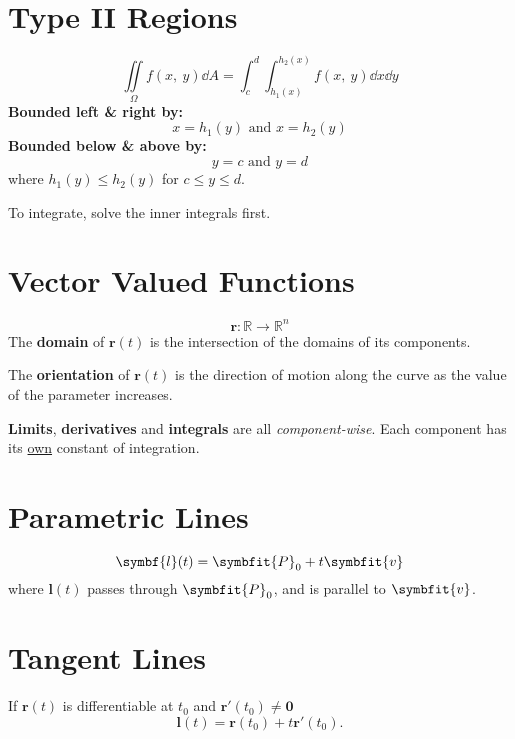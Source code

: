 \documentclass{article}
\begin{document}
\begin{multicols}{3}
    \section*{Type II Regions}
    \begin{equation*}
        \iint\limits_{\Omega} f(x,\: y) \dd{A} = \int_c^d\int_{h_1(x)}^{h_2(x)} f(x,\: y) \dd{x} \dd{y}
    \end{equation*}
    \textbf{Bounded left \& right by:}
    \begin{equation*}
        x=h_1(y) \text{ and } x=h_2(y)
    \end{equation*}
    \textbf{Bounded below \& above by:}
    \begin{equation*}
        y=c \text{ and } y=d
    \end{equation*}
    where $h_1(y) \leq h_2(y)$ for $c \leq y \leq d$.

    To integrate, solve the inner integrals first.
    \section*{Vector Valued Functions}
    \begin{equation*}
        \symbf{r}:\mathbb{R} \to \mathbb{R}^n
    \end{equation*}
    The \textbf{domain} of $\symbf{r}(t)$ is the intersection of the domains
    of its components.

    The \textbf{orientation} of $\symbf{r}(t)$ is the direction of motion along the
    curve as the value of the parameter increases.

    \textbf{Limits}, \textbf{derivatives} and \textbf{integrals} are all \textit{component-wise}. Each component has its \underline{own} constant of integration.
    \section*{Parametric Lines}
    \begin{equation*}
        \symbf{l}(t) = \symbfit{P}_0 + t\symbfit{v}
    \end{equation*}
    where $\symbf{l}(t)$ passes through $\symbfit{P}_0$, and is parallel to $\symbfit{v}$.
    \section*{Tangent Lines}
    If $\symbf{r}(t)$ is differentiable at
    $t_0$ and $\symbf{r'}(t_0)\ne\symbf{0}$
    \begin{equation*}
        \symbf{l}(t) = \symbf{r}(t_0)+t\symbf{r'}(t_0).
    \end{equation*}

\end{multicols}
\end{document}
